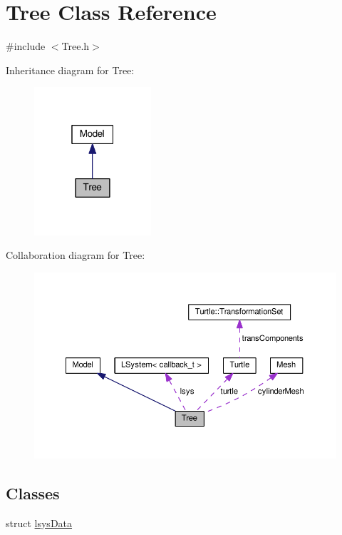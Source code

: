 \hypertarget{class_tree}{}\section{Tree Class Reference}
\label{class_tree}


{\ttfamily \#include $<$Tree.\+h$>$}



Inheritance diagram for Tree\+:\nopagebreak
\begin{figure}[H]
\begin{center}
\leavevmode
\includegraphics[width=123pt]{class_tree__inherit__graph}
\end{center}
\end{figure}


Collaboration diagram for Tree\+:\nopagebreak
\begin{figure}[H]
\begin{center}
\leavevmode
\includegraphics[width=350pt]{class_tree__coll__graph}
\end{center}
\end{figure}
\subsection*{Classes}
\begin{DoxyCompactItemize}
\item 
struct \hyperlink{struct_tree_1_1lsys_data}{lsys\+Data}
\end{DoxyCompactItemize}
